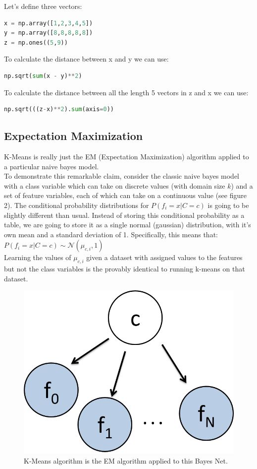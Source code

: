 \documentclass[10pt,letterpaper]{article}
\begin{document}
Let's define three vectors:
\begin{lstlisting}[language=Python]
x = np.array([1,2,3,4,5])
y = np.array([8,8,8,8,8])
z = np.ones((5,9))
\end{lstlisting}
To calculate the distance between x and y we can use:
\begin{lstlisting}[language=Python]
np.sqrt(sum(x - y)**2)
\end{lstlisting}
To calculate the distance between all the length 5 vectors in z and x we can use:
\begin{lstlisting}[language=Python]
np.sqrt(((z-x)**2).sum(axis=0))
\end{lstlisting}

\subsection{Expectation Maximization}
K-Means is really just the EM (Expectation Maximization) algorithm applied to a particular naive bayes model.\\

To demonstrate this remarkable claim, consider the classic naive bayes model with a class variable which can take on discrete values (with domain size $k$) and a set of feature variables, each of which can take on a continuous value (see figure 2). The conditional probability distributions for $P(f_i = x | C= c)$ is going to be slightly different than usual. Instead of storing this conditional probability as a table, we are going to store it as a single normal (gaussian) distribution, with it's own mean and a standard deviation of 1. Specifically, this means that: $P(f_i = x | C= c) \sim \mathcal{N}(\mu_{c,i}, 1)$\\

Learning the values of $\mu_{c,i}$ given a dataset with assigned values to the features but not the class variables is the provably identical to running k-means on that dataset.\\

\begin{figure}[H]
\includegraphics[width=.3\textwidth]{kmeansNB.png}
\centering
\caption{K-Means algorithm is the EM algorithm applied to this Bayes Net.}
\label{figure2}
\end{figure}
\end{document}
